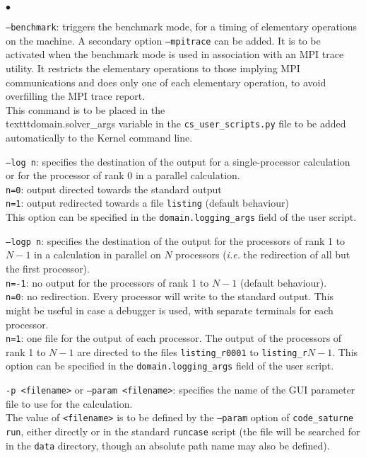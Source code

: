 {{{{\begin{list}{$\bullet$}{}
\item \texttt{--benchmark}: triggers the benchmark mode, for a timing
of elementary operations on the machine. A secondary option
\texttt{--mpitrace} can be added. It is to be activated when the benchmark mode
is used in association with an MPI trace utility. It restricts the elementary
operations to those implying MPI communications and does only one of each
elementary operation, to avoid overfilling the MPI trace report.\\
This command is to be placed in the \\texttt{domain.solver\_args} variable
in the \texttt{cs\_user\_scripts.py} file to be added automatically to the
Kernel command line.

\item \texttt{--log n}: specifies the destination of the output for a
single-processor calculation or for the processor of rank 0 in a parallel
calculation.\\
\hspace*{0.5cm}\texttt{n=0}: output directed towards the standard output\\
\hspace*{0.5cm}\texttt{n=1}: output redirected towards a file \texttt{listing}
(default behaviour)\\
This option can be specified in the \texttt{domain.logging\_args} field
of the user script.

\item \texttt{--logp n}: specifies the destination of the output for the
processors of rank 1 to $N-1$ in a calculation in parallel on $N$ processors
({\em i.e.} the redirection of all but the first processor).\\
\hspace*{0.5cm}\texttt{n=-1}: no output for the processors of rank 1 to $N-1$
(default behaviour).\\
\hspace*{0.5cm}\texttt{n=0}: no redirection. Every processor will write to the
standard output. This might be useful in case a debugger is used, with separate
terminals for each processor.\\
\hspace*{0.5cm}\texttt{n=1}: one file for the output of each processor. The
output of the processors of rank 1 to $N-1$ are directed to the files
\texttt{listing\_r0001} to \texttt{listing\_r$N-1$}.
This option can be specified in the \texttt{domain.logging\_args} field
of the user script.

\item \texttt{-p <filename>} or \texttt{--param <filename>}: specifies the name of the GUI
parameter file to use for the calculation.\\
The value of \texttt{<filename>} is to be defined by the \texttt{--param} option
of \texttt{code\_saturne run}, either directly or in the standard \texttt{runcase}
script (the file will be searched for in the \texttt{data} directory, though
an absolute path name may also be defined).


\end{list}}}}}
